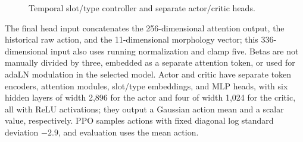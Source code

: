 \begin{figure}[!htb]
\centering
{}
\caption{Temporal slot/type controller and separate actor/critic heads.}\label{fig:network}
\end{figure}

The final head input concatenates the 256-dimensional attention output, the
historical raw action, and the 11-dimensional morphology vector; this
336-dimensional input also uses running normalization and clamp five. Betas are
not manually divided by three, embedded as a separate attention token, or used
for adaLN modulation in the selected model. Actor and critic have separate token
encoders, attention modules, slot/type embeddings, and MLP heads, with six
hidden layers of width 2,896 for the actor and four of width 1,024 for the
critic, all with ReLU activations; they output a Gaussian action mean and a
scalar value, respectively. PPO samples actions with fixed diagonal log standard
deviation $-2.9$, and evaluation uses the mean action.


